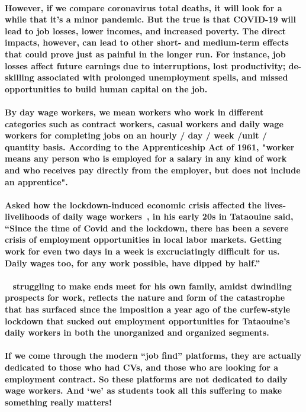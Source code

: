 \documentclass[12pt]{report}
\begin{document}
\paragraph{\normalfont However, if we compare coronavirus total deaths, it will look for a while that it’s a minor pandemic. But the true is that COVID-19 will lead to job losses, lower incomes, and increased poverty. The direct impacts, however, can lead to other short- and medium-term effects that could prove just as painful in the longer run. For instance, job losses affect future earnings due to interruptions, lost productivity; de-skilling associated with prolonged unemployment spells, and missed opportunities to build human capital on the job. }
\paragraph{\normalfont By day wage workers, we mean workers who work in different categories such as contract workers, casual workers and daily wage workers for completing jobs on an hourly / day / week /unit / quantity basis. According to the Apprenticeship Act of 1961, "worker means any person who is employed for a salary in any kind of work and who receives pay directly from the employer, but does not include an apprentice".}
\paragraph{\normalfont \normalfont Asked how the lockdown-induced economic crisis affected the lives-livelihoods of daily wage workers~\cite{one}, in his early 20s in Tataouine said, “Since the time of Covid and the lockdown, there has been a severe crisis of employment opportunities in local labor markets. Getting work for even two days in a week is excruciatingly difficult for us. Daily wages too, for any work possible, have dipped by half.”}
\paragraph{\normalfont ~\cite{one} struggling to make ends meet for his own family, amidst dwindling prospects for work, reflects the nature and form of the catastrophe that has surfaced since the imposition a year ago of the curfew-style lockdown that sucked out employment opportunities for Tataouine’s daily workers in both the unorganized and organized segments.}
\paragraph{ \normalfont If we come through the modern “job find” platforms, they are actually dedicated to those who had CVs, and those who are looking for a employment contract. So these platforms are not dedicated to daily wage workers. \textbf{And ‘we’ as students took all this suffering to make something really matters!}
}
\end{document}
